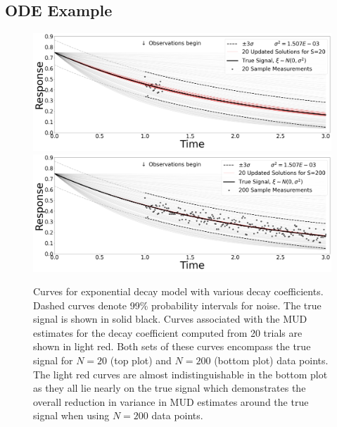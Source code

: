 \subsection{ODE Example}\label{subsec:ode-example}
\begin{figure}[htb]
  \includegraphics[width=\linewidth]{figures/ode/ode_20_reference_solution}
  \includegraphics[width=\linewidth]{figures/ode/ode_200_reference_solution}
  \caption{Curves for exponential decay model with various decay coefficients. Dashed curves denote 99\% probability intervals for noise. The true signal is shown in solid black.
 Curves associated with the MUD estimates for the decay coefficient computed from 20 trials are shown in light red.
 Both sets of these curves encompass the true signal for $N=20$ (top plot) and $N=200$ (bottom plot) data points.
 The light red curves are almost indistinguishable in the bottom plot as they all lie nearly on the true signal which demonstrates the overall reduction in variance in MUD estimates around the true signal when using $N=200$ data points.
	{
	\color{blue}{First line of legend: ``$\pm 3\sigma$ from True Signal''. Second line of legend: ``True signal''. Third line ``Measurements with $N(0,\sigma^2)$ noise''. Then, fourth line of legend: ``Signals based on $\mudpt$ estimates''. Also, make the red curves dash-dotted and less transparent so that they are easier to distinguish. Maybe use a deeper red. }
	}
  }
  \label{fig:ode-reference}
\end{figure}

